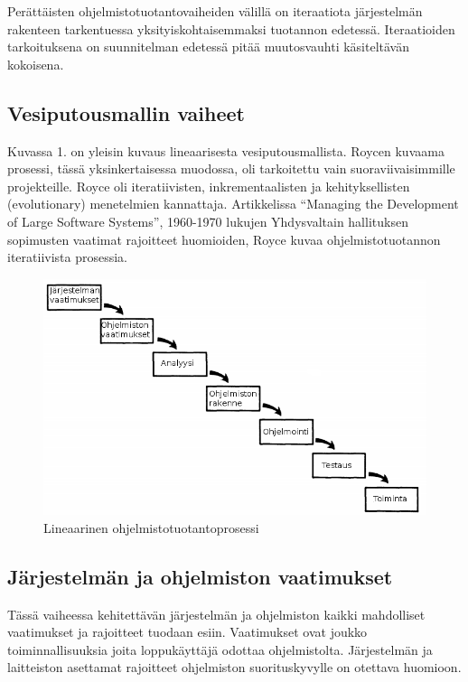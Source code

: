 \documentclass[finnish]{tktltiki2}
\theoremstyle{definition}
\theoremstyle{remark}
\begin{document}
Perättäisten ohjelmistotuotantovaiheiden välillä on iteraatiota järjestelmän rakenteen tarkentuessa yksityiskohtaisemmaksi tuotannon edetessä. Iteraatioiden tarkoituksena on suunnitelman edetessä pitää muutosvauhti käsiteltävän kokoisena\cite{ROY70}.

\subsection{Vesiputousmallin vaiheet}

Kuvassa 1. on yleisin kuvaus lineaarisesta vesiputousmallista. Roycen kuvaama prosessi, tässä yksinkertaisessa muodossa, oli tarkoitettu vain suoraviivaisimmille projekteille. Royce oli iteratiivisten, inkrementaalisten ja kehityksellisten (evolutionary) menetelmien kannattaja. Artikkelissa “Managing the Development of Large Software Systems”, 1960-1970 lukujen Yhdysvaltain hallituksen sopimusten vaatimat rajoitteet huomioiden, Royce kuvaa ohjelmistotuotannon iteratiivista prosessia\cite{LAB03}. 

\begin{figure}[h!]
  \caption{Lineaarinen ohjelmistotuotantoprosessi}
  \centering
    \includegraphics[width=\textwidth]{waterfall}
\end{figure}

\subsection*{Järjestelmän ja ohjelmiston vaatimukset}
Tässä vaiheessa kehitettävän järjestelmän ja ohjelmiston kaikki mahdolliset vaatimukset ja rajoitteet tuodaan esiin. Vaatimukset ovat joukko toiminnallisuuksia joita loppukäyttäjä odottaa ohjelmistolta. Järjestelmän ja laitteiston asettamat rajoitteet ohjelmiston suorituskyvylle on otettava huomioon.
\end{document}

